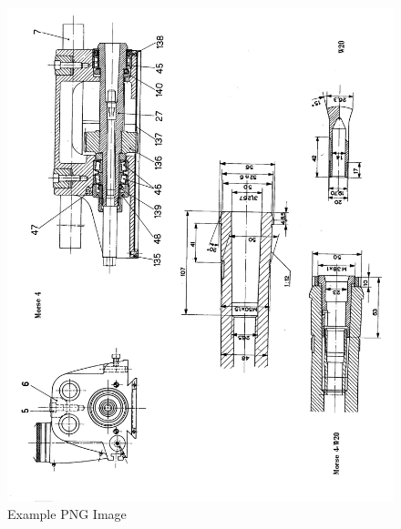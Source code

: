\newpage
\begin{figure}[h]
    \centering
    \includegraphics[width=1.0\linewidth]{images/page_22}
    \caption{Example PNG Image}
    \label{fig:horizontal_spindle_dimensions_1}
\end{figure}
